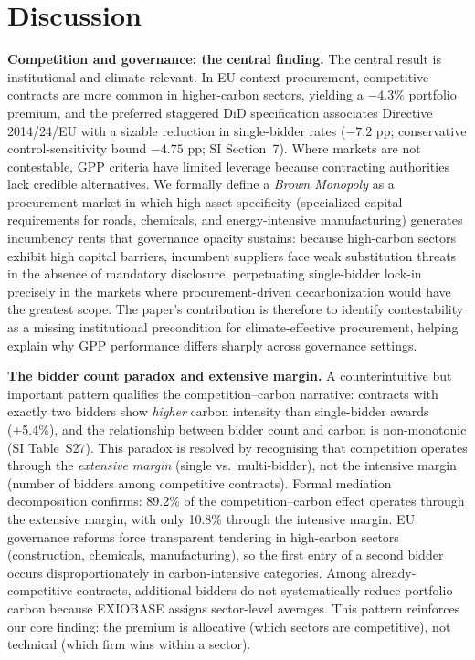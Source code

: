 \documentclass[11pt,a4paper]{article}
\begin{document}
\section{Discussion}

\textbf{Competition and governance: the central finding.} The central result is institutional and climate-relevant. In EU-context procurement, competitive contracts are more common in higher-carbon sectors, yielding a $-4.3\%$ portfolio premium, and the preferred staggered DiD specification associates Directive 2014/24/EU with a sizable reduction in single-bidder rates ($-7.2$ pp; conservative control-sensitivity bound $-4.75$ pp; SI Section~7). Where markets are not contestable, GPP criteria have limited leverage because contracting authorities lack credible alternatives. We formally define a \textit{Brown Monopoly} as a procurement market in which high asset-specificity (specialized capital requirements for roads, chemicals, and energy-intensive manufacturing) generates incumbency rents that governance opacity sustains: because high-carbon sectors exhibit high capital barriers, incumbent suppliers face weak substitution threats in the absence of mandatory disclosure, perpetuating single-bidder lock-in precisely in the markets where procurement-driven decarbonization would have the greatest scope. The paper's contribution is therefore to identify contestability as a missing institutional precondition for climate-effective procurement, helping explain why GPP performance differs sharply across governance settings\cite{grandia2015implementing,cheng2018green,ortegacarrasco2025gpp,rosell2025gpp}.

\textbf{The bidder count paradox and extensive margin.} A counterintuitive but important pattern qualifies the competition--carbon narrative: contracts with exactly two bidders show \textit{higher} carbon intensity than single-bidder awards (+5.4\%), and the relationship between bidder count and carbon is non-monotonic (SI Table~S27). This paradox is resolved by recognising that competition operates through the \textit{extensive margin} (single vs.\ multi-bidder), not the intensive margin (number of bidders among competitive contracts). Formal mediation decomposition confirms: 89.2\% of the competition--carbon effect operates through the extensive margin, with only 10.8\% through the intensive margin\cite{imai2010identification}. EU governance reforms force transparent tendering in high-carbon sectors (construction, chemicals, manufacturing), so the first entry of a second bidder occurs disproportionately in carbon-intensive categories. Among already-competitive contracts, additional bidders do not systematically reduce portfolio carbon because EXIOBASE assigns sector-level averages. This pattern reinforces our core finding: the premium is allocative (which sectors are competitive), not technical (which firm wins within a sector).
\end{document}

